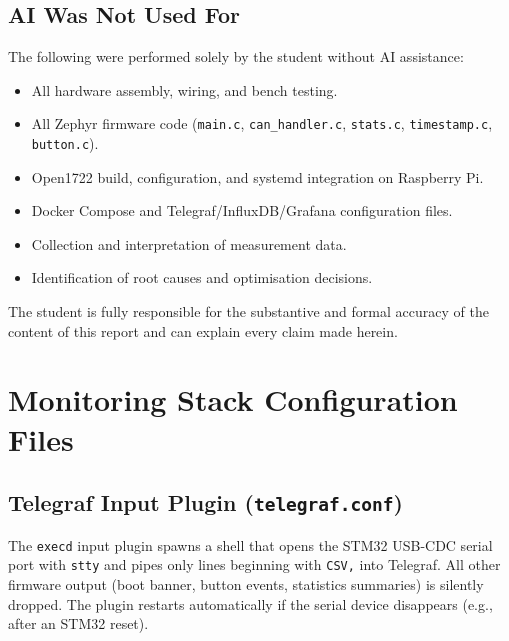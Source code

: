 \documentclass[11pt,a4paper]{article}
\begin{document}
\subsection*{AI Was Not Used For}

The following were performed solely by the student without AI assistance:

\begin{itemize}
    \item All hardware assembly, wiring, and bench testing.
    \item All Zephyr firmware code
          (\texttt{main.c}, \texttt{can\_handler.c}, \texttt{stats.c},
          \texttt{timestamp.c}, \texttt{button.c}).
    \item Open1722 build, configuration, and systemd integration on Raspberry Pi.
    \item Docker Compose and Telegraf/InfluxDB/Grafana configuration files.
    \item Collection and interpretation of measurement data.
    \item Identification of root causes and optimisation decisions.
\end{itemize}

The student is fully responsible for the substantive and formal accuracy of the content
of this report and can explain every claim made herein.

\appendix

\section{Monitoring Stack Configuration Files}
\label{app:monitoring}

\subsection{Telegraf Input Plugin (\texttt{telegraf.conf})}

The \texttt{execd} input plugin spawns a shell that opens the STM32 USB-CDC serial
port with \texttt{stty} and pipes only lines beginning with \texttt{CSV,} into
Telegraf.  All other firmware output (boot banner, button events, statistics summaries)
is silently dropped.  The plugin restarts automatically if the serial device disappears
(e.g., after an STM32 reset).
\end{document}
